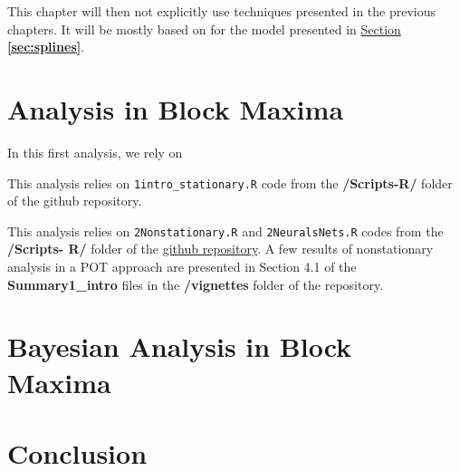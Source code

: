 \documentclass[11pt,a4paper,openany, twosided]{book}
\begin{document}
This chapter will then not explicitly use techniques presented in the previous chapters. It will be mostly based on \citet{ruppert_semiparametric_2003} for the model presented in \hyperref[sec:splines]{Section \textbf{\ref{sec:splines}}}. 
  

\newpage




\chapter{Analysis in Block Maxima}\label{sec:anagev}
\minitoc \thispagestyle{empty}
 \vspace{1cm}


In this first analysis, we rely on 

This analysis relies on \texttt{1intro\_stationary.R} code from the \textbf{/Scripts-R/} folder of the github repository.

This analysis relies on \texttt{2Nonstationary.R} and \texttt{2NeuralsNets.R} codes from the\textbf{ /Scripts-
	R/} folder of the \hyperref[https://github.com/proto4426/PissoortThesis]{github repository}. A few results of nonstationary analysis in a POT approach are
presented in Section 4.1 of the \textbf{Summary1\_intro} files in the \textbf{/vignettes} folder of the repository. 

\newpage

\chapter{Bayesian Analysis in Block Maxima}\label{sec:anabayes}
\minitoc \thispagestyle{empty}
 \vspace{1cm}







\chapter*{Conclusion}
\thispagestyle{empty}
\end{document}
